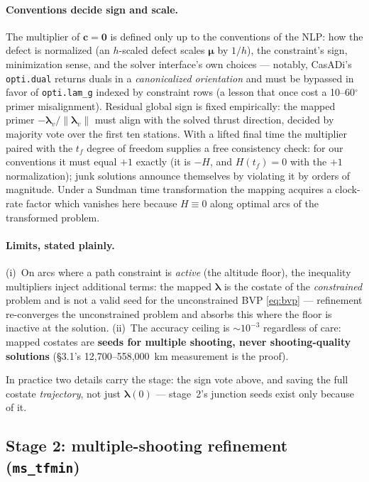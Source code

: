 \documentclass[11pt]{article}
\newcommand{\lv}{\bm{\lambda}_v}
\begin{document}
\paragraph{Conventions decide sign and scale.} The multiplier of
$\bm c = \bm 0$ is defined only up to the conventions of the NLP: how the
defect is normalized (an $h$-scaled defect scales $\bm\mu$ by $1/h$), the
constraint's sign, minimization sense, and the solver interface's own
choices --- notably, CasADi's \texttt{opti.dual} returns duals in a
\emph{canonicalized orientation} and must be bypassed in favor of
\texttt{opti.lam\_g} indexed by constraint rows (a lesson that once cost a
10--60$^\circ$ primer misalignment). Residual global sign is fixed
empirically: the mapped primer $-\lv/\lVert\lv\rVert$ must align with the
solved thrust direction, decided by majority vote over the first ten
stations. With a lifted final time the multiplier paired with the $t_f$
degree of freedom supplies a free consistency check: for our conventions it
must equal $+1$ exactly (it is $-H$, and $H(t_f)=0$ with the $+1$
normalization); junk solutions announce themselves by violating it by
orders of magnitude. Under a Sundman time transformation the mapping
acquires a clock-rate factor which vanishes here because $H \equiv 0$ along
optimal arcs of the transformed problem.

\paragraph{Limits, stated plainly.} (i)~On arcs where a path constraint is
\emph{active} (the altitude floor), the inequality multipliers inject
additional terms: the mapped $\bm\lambda$ is the costate of the
\emph{constrained} problem and is not a valid seed for the unconstrained
BVP \eqref{eq:bvp} --- refinement re-converges the unconstrained problem
and absorbs this where the floor is inactive at the solution. (ii)~The
accuracy ceiling is $\sim10^{-3}$ regardless of care: mapped costates are
\textbf{seeds for multiple shooting, never shooting-quality solutions}
(\S3.1's 12{,}700--558{,}000~km measurement is the proof).

In practice two details carry the stage: the sign vote above, and saving
the full costate \emph{trajectory}, not just $\bm\lambda(0)$ --- stage~2's
junction seeds exist only because of it.

\subsection{Stage 2: multiple-shooting refinement (\texttt{ms\_tfmin})}
\label{sec:mstfmin}
\end{document}
